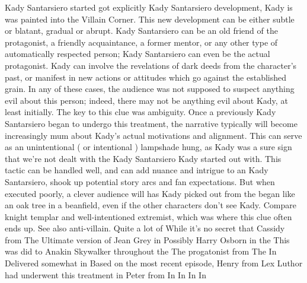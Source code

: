 \documentclass[12pt]{book}
\begin{document}
Kady Santarsiero started got explicitly Kady Santarsiero development, Kady is was painted into the Villain Corner. This new development can be either subtle or blatant, gradual or abrupt. Kady Santarsiero can be an old friend of the protagonist, a friendly acquaintance, a former mentor, or any other type of automatically respected person; Kady Santarsiero can even be the actual protagonist. Kady can involve the revelations of dark deeds from the character's past, or manifest in new actions or attitudes which go against the established grain. In any of these cases, the audience was not supposed to suspect anything evil about this person; indeed, there may not be anything evil about Kady, at least initially. The key to this clue was ambiguity. Once a previously Kady Santarsiero began to undergo this treatment, the narrative typically will become increasingly mum about Kady's actual motivations and alignment. This can serve as an unintentional ( or intentional ) lampshade hung, as Kady was a sure sign that we're not dealt with the Kady Santarsiero Kady started out with. This tactic can be handled well, and can add nuance and intrigue to an Kady Santarsiero, shook up potential story arcs and fan expectations. But when executed poorly, a clever audience will has Kady picked out from the began like an oak tree in a beanfield, even if the other characters don't see Kady. Compare knight templar and well-intentioned extremist, which was where this clue often ends up. See also anti-villain. Quite a lot of While it's no secret that Cassidy from The Ultimate version of Jean Grey in Possibly Harry Osborn in the This was did to Anakin Skywalker throughout the The progatonist from The In Delivered somewhat in Based on the most recent episode, Henry from Lex Luthor had underwent this treatment in Peter from In In In In
\end{document}
